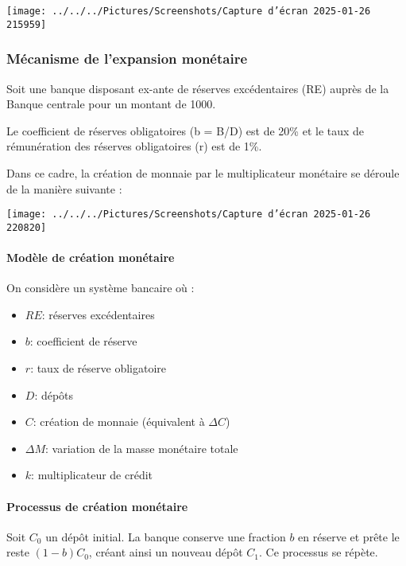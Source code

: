 \documentclass[a4paper, 12pt]{report}
\begin{document}
\begin{center}
	\texttt{[image: ../../../Pictures/Screenshots/Capture d'écran 2025-01-26 215959]}
\end{center}
	
\subsubsection{Mécanisme de l’expansion monétaire}
	
Soit une banque disposant ex-ante de réserves excédentaires (RE) auprès de la Banque centrale pour un montant de 1000.

Le coefficient de réserves obligatoires (b = B/D) est de 20\% et le taux de rémunération des réserves obligatoires (r) est de 1\%.

Dans ce cadre, la création de monnaie par le multiplicateur monétaire se déroule de la manière suivante :
\begin{center}
	
\texttt{[image: ../../../Pictures/Screenshots/Capture d'écran 2025-01-26 220820]}
	
\end{center}
	
\paragraph{Modèle de création monétaire}

On considère un système bancaire où :
\begin{itemize}
	\item $RE$: réserves excédentaires
	\item $b$: coefficient de réserve
	\item $r$: taux de réserve obligatoire
	\item $D$: dépôts
	\item $C$: création de monnaie (équivalent à $\Delta C$)
	\item $\Delta M$: variation de la masse monétaire totale
	\item $k$: multiplicateur de crédit
\end{itemize}

\paragraph{Processus de création monétaire}

Soit $C_0$ un dépôt initial. La banque conserve une fraction $b$ en réserve et prête le reste $(1-b)C_0$, créant ainsi un nouveau dépôt $C_1$. Ce processus se répète.
\end{document}
